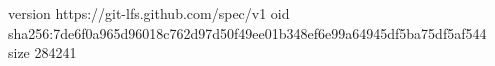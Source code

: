 version https://git-lfs.github.com/spec/v1
oid sha256:7de6f0a965d96018c762d97d50f49ee01b348ef6e99a64945df5ba75df5af544
size 284241
